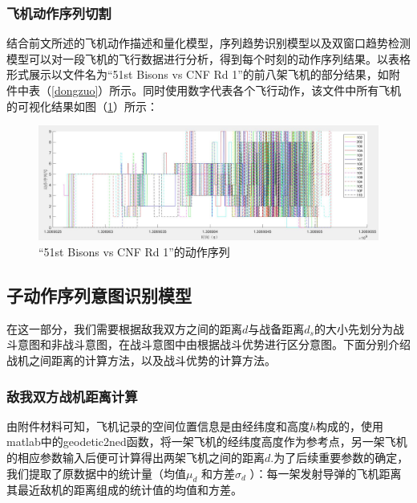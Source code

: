 \documentclass{my_paper}
\begin{document}
\subsubsection{飞机动作序列切割}

结合前文所述的飞机动作描述和量化模型，序列趋势识别模型以及双窗口趋势检测模型可以对一段飞机的飞行数据进行分析，得到每个时刻的动作序列结果。以表格形式展示以文件名为“51st Bisons vs CNF Rd 1”的前八架飞机的部分结果，如附件中表（\ref{dongzuo}）所示。同时使用数字代表各个飞行动作，该文件中所有飞机的可视化结果如图（\ref{dzx}）所示：

\begin {figure}[h]
\centering %
\includegraphics[width=\textwidth]{1zhuan.jpg}
\caption{“51st Bisons vs CNF Rd 1”的动作序列} %
\label{dzx}
\end {figure}

\subsection{子动作序列意图识别模型}
在这一部分，我们需要根据敌我双方之间的距离$d$与战备距离$d_s$的大小先划分为战斗意图和非战斗意图，在战斗意图中由根据战斗优势进行区分意图。下面分别介绍战机之间距离的计算方法，以及战斗优势的计算方法。

\subsubsection{敌我双方战机距离计算}

由附件材料可知，飞机记录的空间位置信息是由经纬度和高度$h$构成的，使用matlab中的geodetic2ned函数，将一架飞机的经纬度高度作为参考点，另一架飞机的相应参数输入后便可计算得出两架飞机之间的距离$d$.为了后续重要参数的确定，我们提取了原数据中的统计量（均值$ \mu_{d} $ 和方差$ \sigma_{d} $ ）：每一架发射导弹的飞机距离其最近敌机的距离组成的统计值的均值和方差。

\end{document}
